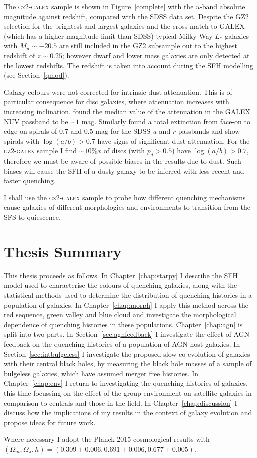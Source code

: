 The \textsc{gz2-galex} sample is shown in Figure~\ref{complete} with the $u$-band absolute magnitude against redshift, compared with the SDSS data set. Despite the GZ2 selection for the brightest and largest galaxies and the cross match to GALEX (which has a higher magnitude limit than SDSS) typical Milky Way $L_*$ galaxies with $M_u \sim -20.5$ are still included in the GZ2 subsample out to the highest redshift of $z \sim 0.25$; however dwarf and lower mass galaxies are only detected at the lowest redshifts. The redshift is taken into account during the SFH modelling (see Section~\ref{qmod}).

Galaxy colours were not corrected for intrinsic dust attenuation. This is of particular consequence for disc galaxies, where attenuation increases with increasing inclination. \cite{Buat05} found the median value of the attenuation in the GALEX NUV passband to be $\sim 1$ mag. Similarly \cite{masters10a} found a total extinction from face-on to edge-on spirals of 0.7 and 0.5 mag for the SDSS $u$ and $r$ passbands and show spirals with $\log(a/b) > 0.7$ have signs of significant dust attenuation. For the \textsc{gz2-galex} sample I find $\sim10\%x$ of discs (with $p_d > 0.5$) have $\log(a/b) > 0.7$, therefore we must be aware of possible biases in the results due to dust. Such biases will cause the SFH of a dusty galaxy to be inferred with less recent and faster quenching. 

I shall use the \textsc{gz2-galex} sample to probe how different quenching mechanisms cause galaxies of different morphologies and environments to transition from the SFS to quiescence. 


\section{Thesis Summary}\label{sec:thesissum}


This thesis proceeds as follows. In Chapter~\ref{chap:starpy} I describe the SFH model used to characterise the colours of quenching galaxies, along with the statistical methods used to determine the distribution of quenching histories in a population of galaxies. In Chapter~\ref{chap:morph} I apply this method across the red sequence, green valley and blue cloud and investigate the morphological dependence of quenching histories in these populations. Chapter~\ref{chap:agn} is split into two parts. In Section~\ref{sec:agnfeedback} I investigate the effect of AGN feedback on the quenching histories of a  population of AGN host galaxies. In Section~\ref{sec:intbulgeless} I investigate the proposed slow co-evolution of galaxies with their central black holes, by measuring the black hole masses of a sample of bulgeless galaxies, which have assumed merger free histories. In Chapter~\ref{chap:env} I return to investigating the quenching histories of galaxies, this time focussing on the effect of the group environment on satellite galaxies in comparison to centrals and those in the field. In Chapter~\ref{chap:discussion} I discuss how the implications of my results in the context of galaxy evolution and propose ideas for future work.

Where necessary I adopt the Planck 2015 cosmological results \citep{planck16} with $(\Omega_m, \Omega_{\lambda}, h) = (0.309 \pm 0.006, 0.691 \pm 0.006, 0.677 \pm 0.005)$. 
